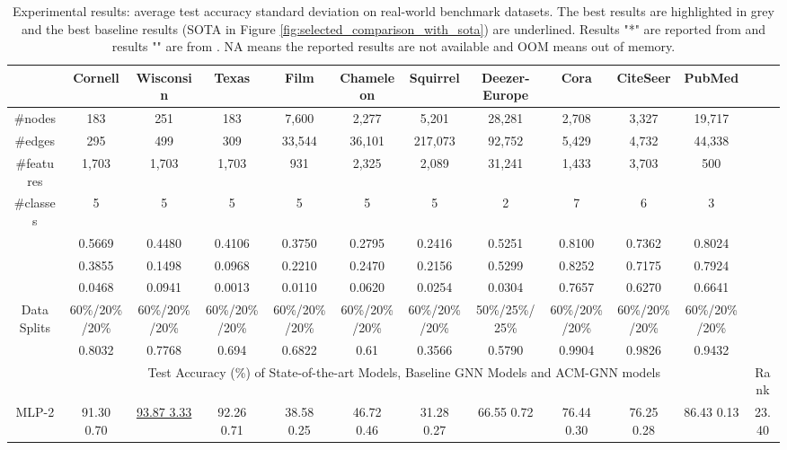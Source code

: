 \documentclass{article}
\newcommand{\0}{{\boldsymbol{0}}}
\newcommand{\6}{{\partial}}
\newcommand{\8}{{\infty}}
\newcommand{\4}{{\nabla}}
\begin{document}
\begin{table}[htbp]
  \centering
  \tiny
  \setlength{\tabcolsep}{0.5pt}
  \caption{Experimental results: average test accuracy  standard deviation on  real-world benchmark datasets. The best results are highlighted in grey and the best baseline results (SOTA in Figure \ref{fig:selected_comparison_with_sota}) are underlined. Results "*" are reported from \cite{chien2021adaptive,lim2021new} and results "" are from \cite{pei2020geom}. NA means the reported results are not available and OOM means out of memory. }
\begin{tabular}{c|cccccccccc|c}
    \toprule
    \toprule
          & Cornell & Wisconsin & Texas & Film  & Chameleon & Squirrel & Deezer-Europe & Cora  & CiteSeer & PubMed &  \\
    \midrule
    \#nodes & 183   & 251   & 183   & 7,600 & 2,277 & 5,201 & 28,281 & 2,708 & 3,327 & 19,717 &  \\
    \#edges & 295   & 499   & 309   & 33,544 & 36,101 & 217,073 & 92,752 & 5,429 & 4,732 & 44,338 &  \\
    \#features & 1,703 & 1,703 & 1,703 & 931   & 2,325 & 2,089 & 31,241 & 1,433 & 3,703 & 500   &  \\
    \#classes & 5     & 5     & 5     & 5     & 5     & 5     & 2     & 7     & 6     & 3     &  \\
     & 0.5669 & 0.4480 & 0.4106 & 0.3750 & 0.2795 & 0.2416 & 0.5251 & 0.8100 & 0.7362 & 0.8024 &  \\
     & 0.3855 & 0.1498 & 0.0968 & 0.2210 & 0.2470 & 0.2156 & 0.5299 & 0.8252 & 0.7175 & 0.7924 &  \\
     & 0.0468 & 0.0941 & 0.0013 & 0.0110 & 0.0620 & 0.0254 & 0.0304 & 0.7657 & 0.6270 & 0.6641 &  \\
    Data Splits & 60\%/20\%/20\% & 60\%/20\%/20\% & 60\%/20\%/20\% & 60\%/20\%/20\% & 60\%/20\%/20\% & 60\%/20\%/20\% & 50\%/25\%/25\% & 60\%/20\%/20\% & 60\%/20\%/20\% & 60\%/20\%/20\% &  \\
     & 0.8032 & 0.7768 & 0.694 & 0.6822 & 0.61  & 0.3566 & 0.5790 & 0.9904 & 0.9826 & 0.9432 &  \\
\midrule
    \midrule
          & \multicolumn{10}{c|}{Test Accuracy (\%) of State-of-the-art Models, Baseline GNN Models and ACM-GNN models} & Rank \\
    \midrule
    MLP-2 & 91.30  0.70 & \underline{93.87  3.33} & 92.26  0.71 & 38.58  0.25 & 46.72  0.46 & 31.28  0.27 & 66.55  0.72 & 76.44  0.30 & 76.25  0.28 & 86.43  0.13 & 23.40 \\

\end{tabular}
\end{table}
\end{document}
